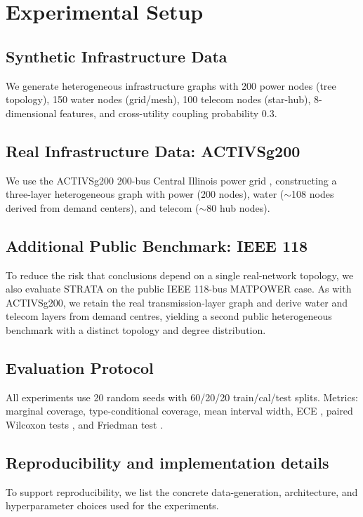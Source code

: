 \documentclass[twoside,11pt]{article}
\begin{document}
\section{Experimental Setup}
\label{sec:experiments}

\subsection{Synthetic Infrastructure Data}

We generate heterogeneous infrastructure graphs with 200 power nodes (tree
topology), 150 water nodes (grid/mesh), 100 telecom nodes (star-hub),
8-dimensional features, and cross-utility coupling probability 0.3.

\subsection{Real Infrastructure Data: ACTIVSg200}

We use the ACTIVSg200 200-bus Central Illinois power grid
\citep{birchfield2017grid}, constructing a three-layer heterogeneous
graph with power (200 nodes), water ($\sim$108 nodes derived from demand
centers), and telecom ($\sim$80 hub nodes).

\subsection{Additional Public Benchmark: IEEE 118}

To reduce the risk that conclusions depend on a single real-network topology, we
also evaluate STRATA on the public IEEE 118-bus MATPOWER case. As with
ACTIVSg200, we retain the real transmission-layer graph and derive water and
telecom layers from demand centres, yielding a second public heterogeneous
benchmark with a distinct topology and degree distribution.

\subsection{Evaluation Protocol}

All experiments use 20 random seeds with 60/20/20 train/cal/test splits.
Metrics: marginal coverage, type-conditional coverage, mean interval width,
ECE \citep{guo2017calibration}, paired Wilcoxon tests
\citep{wilcoxon1945individual}, and Friedman test \citep{friedman1937use}.

\subsection{Reproducibility and implementation details}
To support reproducibility, we list the concrete data-generation,
architecture, and hyperparameter choices used for the experiments.
\end{document}
